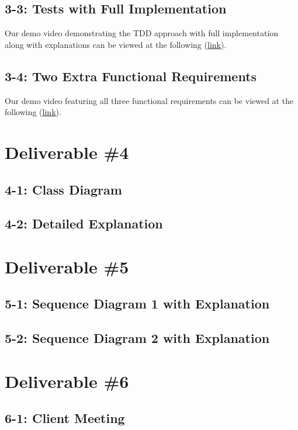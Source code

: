 \documentclass[11pt,a4paper]{article}
\begin{document}
\subsection*{3-3: Tests with Full Implementation}

Our demo video demonstrating the TDD approach with full implementation along with explanations can be viewed at the following (\href{https://www.youtube.com/watch?v=h2C-4-hQrhM&feature=youtu.be}{\underline{link}}).

\subsection*{3-4: Two Extra Functional Requirements}

Our demo video featuring all three functional requirements can be viewed at the following (\href{https://drive.google.com/file/d/1hGAfxo0Bnyy5d5u16bPnoJyps9X3MBN_/view?usp=sharing}{\underline{link}}).



\newpage


\section*{Deliverable \#4}

\subsection*{4-1: Class Diagram}

\subsection*{4-2: Detailed Explanation}

\newpage

\section*{Deliverable \#5}

\subsection*{5-1: Sequence Diagram 1 with Explanation}


\subsection*{5-2: Sequence Diagram 2 with Explanation}

\newpage

\section*{Deliverable \#6}

\subsection*{6-1: Client Meeting}
\end{document}
